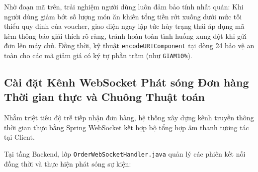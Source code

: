 \documentclass{uetgraduation}
\begin{document}
Nhờ đoạn mã trên, trải nghiệm người dùng luôn đảm bảo tính nhất quán: Khi người dùng giảm bớt số lượng món ăn khiến tổng tiền rớt xuống dưới mức tối thiểu quy định của voucher, giao diện ngay lập tức hủy trạng thái áp dụng mã kèm thông báo giải thích rõ ràng, tránh hoàn toàn tình huống xung đột khi gửi đơn lên máy chủ. Đồng thời, kỹ thuật \texttt{encodeURIComponent} tại dòng 24 bảo vệ an toàn cho các mã giảm giá có ký tự phần trăm (như \texttt{GIAM10\%}).

\subsection{Cài đặt Kênh WebSocket Phát sóng Đơn hàng Thời gian thực và Chuông Thuật toán}
Nhằm triệt tiêu độ trễ tiếp nhận đơn hàng, hệ thống xây dựng kênh truyền thông thời gian thực bằng Spring WebSocket kết hợp bộ tổng hợp âm thanh tương tác tại Client.

Tại tầng Backend, lớp \texttt{OrderWebSocketHandler.java} quản lý các phiên kết nối đồng thời và thực hiện phát sóng sự kiện:
\end{document}
